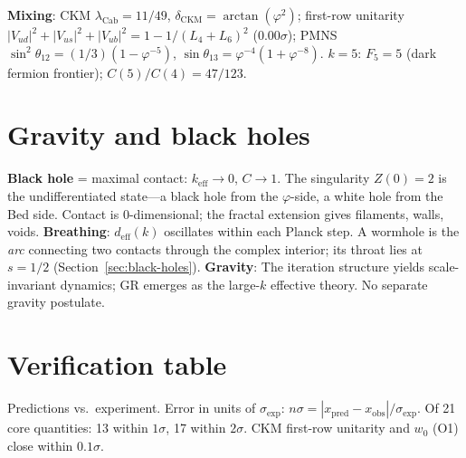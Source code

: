 \documentclass[12pt,a4paper]{article}
\begin{document}
\textbf{Mixing}: CKM $\lambda_{\mathrm{Cab}} = 11/49$, $\delta_{\mathrm{CKM}} = \arctan(\varphi^2)$; first-row unitarity $|V_{ud}|^2{+}|V_{us}|^2{+}|V_{ub}|^2 = 1 - 1/(L_4{+}L_6)^2$ ($0.00\sigma$); PMNS $\sin^2\theta_{12} = (1/3)(1-\varphi^{-5})$, $\sin\theta_{13} = \varphi^{-4}(1+\varphi^{-8})$. \textbf{$k = 5$}: $F_5 = 5$ (dark fermion frontier); $C(5)/C(4) = 47/123$.

\section{Gravity and black holes}
\label{sec:gravity}

\textbf{Black hole} = maximal contact: $k_{\mathrm{eff}} \to 0$, $C \to 1$. The singularity $Z(0) = 2$ is the undifferentiated state---a black hole from the $\varphi$-side, a white hole from the Bed side. Contact is 0-dimensional; the fractal extension gives filaments, walls, voids. \textbf{Breathing}: $d_{\mathrm{eff}}(k)$ oscillates within each Planck step. A wormhole is the \emph{arc} connecting two contacts through the complex interior; its throat lies at $s = 1/2$ (Section~\ref{sec:black-holes}). \textbf{Gravity}: The iteration structure yields scale-invariant dynamics; GR emerges as the large-$k$ effective theory. No separate gravity postulate.

\section{Verification table}
\label{sec:verification}
\label{sec:all-formulas}
\label{sec:derivation-tree-expanded}

Predictions vs.\ experiment. Error in units of $\sigma_{\mathrm{exp}}$: $n\sigma = |x_{\mathrm{pred}} - x_{\mathrm{obs}}|/\sigma_{\mathrm{exp}}$. Of 21 core quantities: 13 within $1\sigma$, 17 within $2\sigma$. CKM first-row unitarity and $w_0$ (O1) close within $0.1\sigma$.
\end{document}
